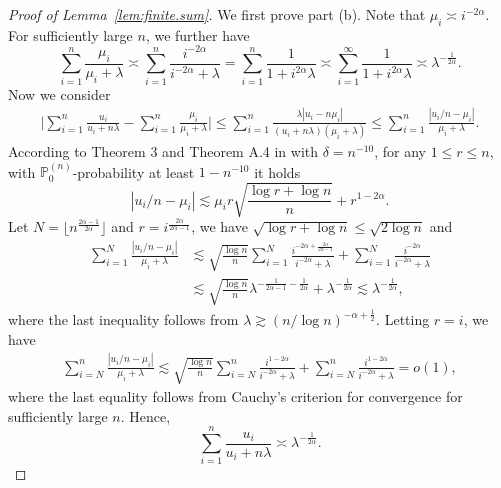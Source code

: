 \documentclass[12pt]{article}
\newcommand{\PP}{\mathbb{P}}
\theoremstyle{plain}
\theoremstyle{nonitalicremark}
\begin{document}
\begin{appendices}
\begin{proof}[Proof of Lemma~\ref{lem:finite.sum}]
We first prove part (b). Note that $\mu_i \asymp i^{-2\alpha}$. For sufficiently large $n$, we further have
\begin{equation}
\sum_{i=1}^n \frac{\mu_i}{\mu_i + \lambda} \asymp \sum_{i=1}^n \frac{i^{-2\alpha}}{i^{-2\alpha} + \lambda} = \sum_{i=1}^n \frac{1}{1+i^{2\alpha} \lambda}\asymp \sum_{i=1}^\infty \frac{1}{1+i^{2\alpha} \lambda} \asymp \lambda^{-\frac{1}{2\alpha}}.
\end{equation}
Now we consider
\begin{align}
\bigg| \sum_{i=1}^n \frac{u_i}{u_i + n\lambda} - \sum_{i=1}^n \frac{\mu_i}{\mu_i + \lambda} \bigg| \leq \sum_{i=1}^n \frac{\lambda |u_i - n\mu_i|}{(u_i + n\lambda)(\mu_i + \lambda)} \leq \sum_{i=1}^n \frac{ |u_i/n - \mu_i|}{\mu_i + \lambda}.
\end{align}
According to Theorem 3 and Theorem A.4 in \cite{braun2006accurate} with $\delta = n^{-10}$, for any $1\leq r\leq n$, with $\PP_0^{(n)}$-probability at least $1-n^{-10}$ it holds
\begin{equation}
|u_i/n - \mu_i| \lesssim \mu_i r \sqrt{ \frac{\log r + \log n}{n}} + r^{1-2\alpha}.
\end{equation} 
Let $N = \lfloor n^{\frac{2\alpha-1}{2\alpha}}\rfloor$ and $r = i^{\frac{2\alpha}{2\alpha-1}}$, we have $\sqrt{\log r + \log n} \leq \sqrt{2\log n}$ and
\begin{align}
\sum_{i=1}^N \frac{ |u_i/n - \mu_i|}{\mu_i + \lambda} &\lesssim \sqrt{\frac{\log n}{n}}\sum_{i=1}^N \frac{ i^{-2\alpha+\frac{2\alpha}{2\alpha-1}} }{i^{-2\alpha} + \lambda} + \sum_{i=1}^N \frac{ i^{-2\alpha }}{i^{-2\alpha} + \lambda}\\
&\lesssim \sqrt{\frac{\log n}{n}} \lambda^{-\frac{1}{2\alpha-1}-\frac{1}{2\alpha}} + \lambda^{-\frac{1}{2\alpha}} \lesssim \lambda^{-\frac{1}{2\alpha}},
\end{align}
where the last inequality follows from $\lambda \gtrsim (n/\log n)^{-\alpha + \frac{1}{2}}$. Letting $r = i$, we have
\begin{align}
\sum_{i=N}^n \frac{ |u_i/n - \mu_i|}{\mu_i + \lambda} \lesssim  \sqrt{\frac{\log n}{n}} \sum_{i=N}^n \frac{ i^{1-2\alpha}}{i^{-2\alpha} + \lambda} + \sum_{i=N}^n \frac{ i^{1-2\alpha }}{i^{-2\alpha} + \lambda} = o(1),
\end{align}
where the last equality follows from Cauchy's criterion for convergence for sufficiently large $n$. Hence,
\begin{equation}
\sum_{i=1}^n \frac{u_i}{u_i + n\lambda} \asymp \lambda^{-\frac{1}{2\alpha}}.
\end{equation}


\end{proof}
\end{appendices}
\end{document}
